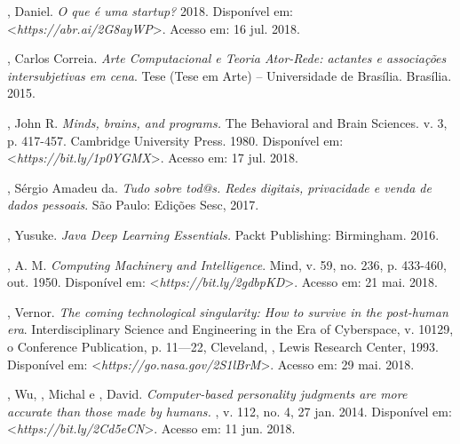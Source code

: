 \begin{Parskip}
, Daniel. \emph{O que é uma startup?} 2018. Disponível em:
\textless{}\emph{https://abr.ai/2G8ayWP}\textgreater{}. Acesso em: 16 jul. 2018.

, Carlos Correia. \emph{Arte Computacional e Teoria Ator-Rede:
actantes e associações intersubjetivas em cena}. Tese (Tese em Arte) --
Universidade de Brasília. Brasília. 2015.

, John R. \emph{Minds, brains, and programs.} The Behavioral and
Brain Sciences. v. 3, p. 417-457. Cambridge University Press. 1980.
Disponível em: \textless{}\emph{https://bit.ly/1p0YGMX}\textgreater{}. Acesso em: 17 jul. 2018.

, Sérgio Amadeu da. \emph{Tudo sobre tod@s. Redes digitais,
privacidade e venda de dados pessoais}. São Paulo: Edições Sesc, 2017.

, Yusuke. \emph{Java Deep Learning Essentials.} Packt
Publishing: Birmingham. 2016.

, A. M. \emph{Computing Machinery and Intelligence}. Mind, v.
59, no. 236, p. 433-460, out. 1950. Disponível em: \textless{}\emph{https://bit.ly/2gdbpKD}\textgreater{}. Acesso em: 21 mai. 2018.

, Vernor. \emph{The coming technological singularity: How to
survive in the post-human era}. Interdisciplinary Science and
Engineering in the Era of Cyberspace, v. 10129, o Conference
Publication, p. 11---22, Cleveland, ,  Lewis Research Center,
1993. Disponível em: \textless{}\emph{https://go.nasa.gov/2S1lBrM}\textgreater{}. Acesso em: 29 mai. 2018.

, Wu, , Michal e , David.
\emph{Computer-based personality judgments are more accurate than
those made by humans.} , v. 112, no. 4, 27 jan. 2014. Disponível em:
\textless{}\emph{https://bit.ly/2Cd5eCN}\textgreater{}. Acesso em: 11 jun. 2018.
\end{Parskip}